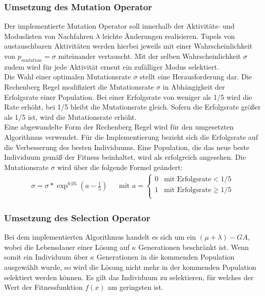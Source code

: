 \subsubsection*{Umsetzung des Mutation Operator}

Der implementierte Mutation Operator soll innerhalb der Aktivitäts- und Moduslisten von Nachfahren $\lambda$ leichte Änderungen realisieren. Tupels von austauschbaren Aktivitäten werden hierbei jeweils mit einer Wahrscheinlichkeit von $p_{mutation} = \sigma$ miteinander vertauscht. Mit der selben Wahrscheinlichkeit $\sigma$ zudem wird für jede Aktivität erneut ein zufälliger Modus selektiert. \\

Die Wahl einer optimalen Mutationsrate $\sigma$ stellt eine Herausforderung dar. Die Rechenberg Regel modifiziert die Mutationsrate $\sigma$ in Abhängigkeit der Erfolgsrate einer Population. Bei einer Erfolgsrate von weniger als 1/5 wird die Rate erhöht, bei 1/5 bleibt die Mutationsrate gleich. Sofern die Erfolgsrate größer als 1/5 ist, wird die Mutationsrate erhöht. \cite[vgl.][S. 24 f.]{kramer_genetic_2017} \\

Eine abgewandelte Form der Rechenberg Regel wird für den umgesetzten Algorithmus verwendet. Für die Implementierung bezieht sich die Erfolgsrate auf die Verbesserung des besten Individuums. Eine Population, die das neue beste Individuum gemäß der Fitness beinhaltet, wird als erfolgreich angesehen. Die Mutationsrate $\sigma$ wird über die folgende Formel geändert:
\begin{align*}
    \sigma = \sigma * \exp^{0.05}(a - \tfrac{1}{5}) && \text{mit }a = \begin{cases}
    0 & \text{mit Erfolgsrate} < 1/5 \\ 
    1 & \text{mit Erfolgsrate} \geq 1/5 \\ 
    \end{cases}
\end{align*}

\subsubsection*{Umsetzung des Selection Operator}
Bei dem implementierten Algorithmus handelt es sich um ein $(\mu+\lambda)-GA$, wobei die Lebensdauer einer Lösung auf $\kappa$ Generationen beschränkt ist. Wenn somit ein Individuum über $\kappa$ Generationen in die kommenden Population ausgewählt wurde, so wird die Lösung nicht mehr in der kommenden Population selektiert werden können. Es gilt das Individuum zu selektieren, für welches der Wert der Fitnessfunktion $f(x)$ am geringsten ist. 

